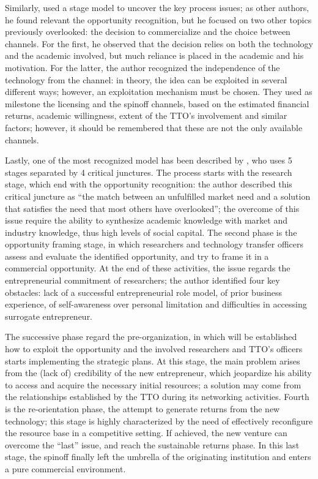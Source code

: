 Similarly, \citet{Lockett2005} used a stage model to uncover the key process issues; as other authors, he found relevant the opportunity recognition, but he focused on two other topics previously overlooked: the decision to commercialize and the choice between channels. For the first, he observed that the decision relies on both the technology and the academic involved, but much reliance is placed in the academic and his motivation. For the latter, the author recognized the independence of the technology from the channel: in theory, the idea can be exploited in several different ways; however, an exploitation mechanism must be chosen. They used as milestone the licensing and the spinoff channels, based on the estimated financial returns, academic willingness, extent of the TTO's involvement and similar factors; however, it should be remembered that these are not the only available channels.

Lastly, one of the most recognized model has been described by \citet{Vohora2004}, who uses 5 stages separated by 4 critical junctures. The process starts with the research stage, which end with the opportunity recognition: the author described this critical juncture as \enquote{the match between an unfulfilled market need and a solution that satisfies the need that most others have overlooked}; the overcome of this issue require the ability to synthesize academic knowledge with market and industry knowledge, thus high levels of social capital. The second phase is the opportunity framing stage, in which researchers and technology transfer officers assess and evaluate the identified opportunity, and try to frame it in a commercial opportunity. At the end of these activities, the issue regards the entrepreneurial commitment of researchers; the author identified four key obstacles: lack of a successful entrepreneurial role model, of prior business experience, of self-awareness over personal limitation and difficulties in accessing surrogate entrepreneur. 

The successive phase regard the pre-organization, in which will be established how to exploit the opportunity and the involved researchers and TTO's officers starts implementing the strategic plans. At this stage, the main problem arises from the (lack of) credibility of the new entrepreneur, which jeopardize his ability to access and acquire the necessary initial resources; a solution may come from the relationships established by the TTO during its networking activities. Fourth is the re-orientation phase, the attempt to generate returns from the new technology; this stage is highly characterized by the need of effectively reconfigure the resource base in a competitive setting. If achieved, the new venture can overcome the \enquote{last} issue, and reach the sustainable returns phase. In this last stage, the spinoff finally left the umbrella of the originating institution and enters a pure commercial environment.

